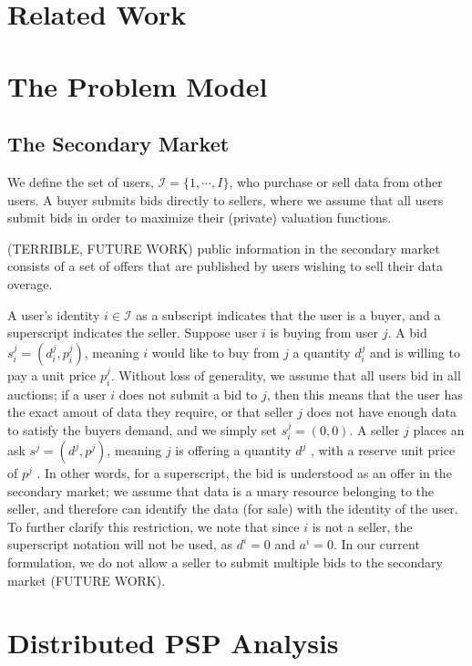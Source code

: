 \documentclass[12pt]{article}
\theoremstyle{definition}
\newcommand{\mcI}{\mathcal{I}}
\begin{document}
\begin{multicols}{2}
\section{Related Work}

\section{The Problem Model}
\subsection{The Secondary Market}

We define the set of users, $\mcI = \lbrace 1, \cdots, I\rbrace$, who purchase or sell
data from other users. A buyer submits bids directly to sellers, where we
assume that all users submit bids in order to maximize their
(private) valuation functions. 

(TERRIBLE, FUTURE WORK) public information in the
secondary market consists of a set of offers that are published by users
wishing to sell their data overage. 

A user's identity $i \in \mcI$ as a subscript indicates that the user
is a buyer, and a superscript indicates the seller.
Suppose user $i$ is buying from user $j$. A bid $s_i^j = (d_i^j, p_i^j)$,
meaning $i$ would like to buy from $j$ a quantity $d^j_i$ and is willing to pay
a unit price $p^j_i$. Without loss of generality, we assume that all users bid in all
auctions; if a user $i$ does not submit a bid to $j$, then this means that
the user has the exact amout of data they require, or that seller $j$ does not have
enough data to satisfy the buyers demand, and we simply set $s_i^j = (0, 0)$.
A seller $j$ places an ask $s^j = (d^j, p^j)$, meaning $j$ is offering a
quantity $d^j$ , with a reserve unit price of $p^j$ . In other words, for a
superscript, the bid is understood as an offer in the secondary
market; we assume that data is a unary resource belonging to the seller, and
therefore can identify the data (for sale) with the identity of the user.
To further clarify this restriction, we note that since $i$ is not a seller,
the superscript notation will not be used, as $d^i = 0$ and
$a^i = 0$. In our current formulation, we do not allow a seller to submit
multiple bids to the secondary market (FUTURE WORK).

\section{Distributed PSP Analysis}


\end{multicols}
\end{document}
